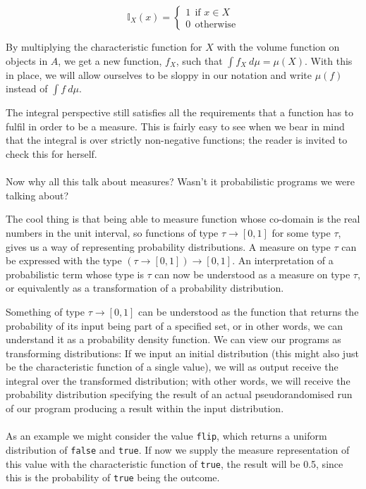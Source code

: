 \documentclass[11pt, leqno, titlepage]{article}
\theoremstyle{definition}
\begin{document}
$$\mathbb{I}_X(x)=
\begin{cases}
  1~~\text{if }x\in X\\
  0~~\text{otherwise}
\end{cases}$$

By multiplying the characteristic function for $X$ with the volume function on
objects in $A$, we get a new function, $f_X$, such that $\int f_X~d\mu =
\mu(X)$. With this in place, we will allow ourselves to be sloppy in our notation and
write $\mu(f)$ instead of $\int f~d\mu$.

The integral perspective still satisfies all the requirements that a function has to
fulfil in order to be a measure. This is fairly easy to see when we bear in mind that
the integral is over strictly non-negative functions; the reader is invited to check
this for herself.\\
\\
Now why all this talk about measures? Wasn't it probabilistic programs we were
talking about?

The cool thing is that being able to measure function whose co-domain is the real
numbers in the unit interval, so functions of type $\tau\to[0,1]$ for some type
$\tau$, gives us a way of representing probability distributions. A measure on type
$\tau$ can be expressed with the type $(\tau\to[0,1])\to[0,1]$. An interpretation of
a probabilistic term whose type is $\tau$ can now be understood as a measure on type
$\tau$, or equivalently as a transformation of a probability distribution.

Something of type $\tau\to[0,1]$ can be understood as the function that returns the
probability of its input being part of a specified set, or in other words, we can
understand it as a probability density function. We can view our programs as
transforming distributions: If we input an initial distribution (this might also just
be the characteristic function of a single value), we will as output receive the
integral over the transformed distribution; with other words, we will receive the
probability distribution specifying the result of an actual pseudorandomised run of
our program producing a result within the input distribution.\\
\\
As an example we might consider the value \texttt{flip}, which returns a uniform
distribution of \texttt{false} and \texttt{true}. If now we supply the measure
representation of this value with the characteristic function of \texttt{true}, the
result will be 0.5, since this is the probability of \texttt{true} being the
outcome.
\end{document}
